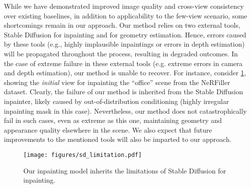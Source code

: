 While we have demonstrated improved image quality and cross-view consistency over existing baselines, in addition to applicability to the few-view scenario, some shortcomings remain in our approach. Our method relies on two external tools, Stable Diffusion \cite{stable.diffusion} for inpainting and \duster \cite{dust3r} for geometry estimation. Hence, errors caused by these tools (e.g., highly implausible inpaintings or errors in depth estimation) will be propagated throughout the process, resulting in degraded outcomes. In the case of extreme failure in these external tools (e.g. extreme errors in camera and depth estimation), our method is unable to recover.
For instance, consider \cref{fig:sd-limitation}, showing the \emph{initial} view for inpainting the ``office'' scene from the NeRFiller dataset. Clearly, the failure of our method is inherited from the Stable Diffusion inpainter, likely caused by out-of-distribution conditioning (highly irregular inpainting mask in this case). Nevertheless, our method does not catastrophically fail in such cases, even as extreme as this one, maintaining geometry and appearance quality elsewhere in the scene.
We also expect that future improvements to the mentioned tools will also be imparted to our approach.

\begin{figure}[t]
    \centering
    \texttt{[image: figures/sd\_limitation.pdf]}
    \caption{Our inpainting model inherits the limitations of Stable Diffusion for inpainting.}
    \label{fig:sd-limitation}
\end{figure}


